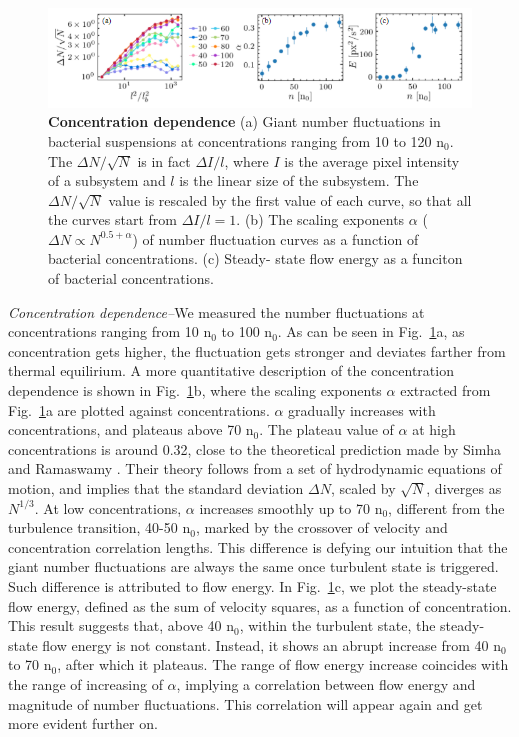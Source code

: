 \documentclass[twocolumn,aps,prl,amsmath,amssymb,longbibliography]{revtex4-2}
\begin{document}
\begin{figure}[!]
\begin{center}
\includegraphics[width=\textwidth]{figures/fig-3-v3.png}
\caption[]{\textbf{Concentration dependence} (a) Giant number fluctuations in bacterial suspensions at concentrations ranging from 10 to 120 n$_0$. The $\Delta N/\sqrt{N}$ is in fact $\Delta I/l$, where $I$ is the average pixel intensity of a subsystem and $l$ is the linear size of the subsystem. The $\Delta N/\sqrt{N}$ value is rescaled by the first value of each curve, so that all the curves start from $\Delta I/l=1$. (b) The scaling exponents $\alpha$ ($\Delta N \propto N^{0.5+\alpha}$) of number fluctuation curves as a function of bacterial concentrations. (c) Steady- state flow energy as a funciton of bacterial concentrations.}
\label{fig:3}
\end{center}
\end{figure}
\textit{Concentration dependence--}We measured the number fluctuations at concentrations ranging from 10 n$_0$ to 100 n$_0$. As can be seen in Fig.~\ref{fig:3}a, as concentration gets higher, the fluctuation gets stronger and deviates farther from thermal equilirium. A more quantitative description of the concentration dependence is shown in Fig.~\ref{fig:3}b, where the scaling exponents $\alpha$ extracted from Fig.~\ref{fig:3}a are plotted against concentrations. $\alpha$ gradually increases with concentrations, and plateaus above 70 n$_0$. The plateau value of $\alpha$ at high concentrations is around 0.32, close to the theoretical prediction made by Simha and Ramaswamy \cite{PhysRevLett.89.058101}. Their theory follows from a set of hydrodynamic equations of motion, and implies that the standard deviation $\Delta N$, scaled by
$\sqrt N$, diverges as $N^{1/3}$. At low concentrations, $\alpha$ increases smoothly up to 70 n$_0$, different from the turbulence transition, 40-50 n$_0$, marked by the crossover of velocity and concentration correlation lengths. This difference is defying our intuition that the giant number fluctuations are always the same once turbulent state is triggered. Such difference is attributed to flow energy. In Fig.~\ref{fig:3}c, we plot the steady-state flow energy, defined as the sum of velocity squares, as a function of concentration. This result suggests that, above 40 n$_0$, within the turbulent state, the steady-state flow energy is not constant. Instead, it shows an abrupt increase from 40 n$_0$ to 70 n$_0$, after which it plateaus. The range of flow energy increase coincides with the range of increasing of $\alpha$, implying a correlation between flow energy and magnitude of number fluctuations. This correlation will appear again and get more evident further on.
\end{document}
